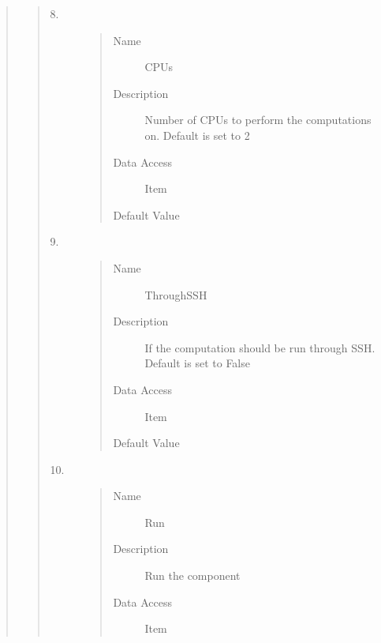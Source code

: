 \documentclass[letterpaper,10pt,english]{sphinxmanual}
\begin{document}
\begin{quote}
\begin{description}
\begin{quote}
\begin{description}
\item[{8.}] \leavevmode\begin{quote}\begin{description}
\item[{Name}] \leavevmode
CPUs

\item[{Description}] \leavevmode
Number of CPUs to perform the computations on. Default is set to 2

\item[{Data Access}] \leavevmode
Item

\item[{Default Value}] \leavevmode
{}

\end{description}\end{quote}

\item[{9.}] \leavevmode\begin{quote}\begin{description}
\item[{Name}] \leavevmode
ThroughSSH

\item[{Description}] \leavevmode
If the computation should be run through SSH. Default is set to False

\item[{Data Access}] \leavevmode
Item

\item[{Default Value}] \leavevmode
{}

\end{description}\end{quote}

\item[{10.}] \leavevmode\begin{quote}\begin{description}
\item[{Name}] \leavevmode
Run

\item[{Description}] \leavevmode
Run the component

\item[{Data Access}] \leavevmode
Item


\end{description}
\end{quote}
\end{description}
\end{quote}
\end{description}
\end{quote}
\end{document}
